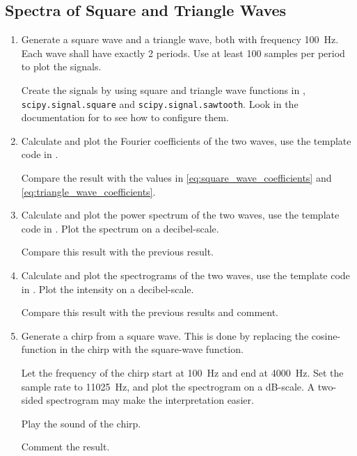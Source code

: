 \subsection{Spectra of Square and Triangle Waves}	
\begin{enumerate}[1)]
\item Generate a square wave and a triangle wave, both with frequency \qty{100}{Hz}. 
	Each wave shall have exactly 2 periods. Use at least 100 samples per period to plot the signals.
	
	Create the signals by using square and triangle wave functions in \scipy, \verb|scipy.signal.square| and \verb|scipy.signal.sawtooth|. Look in the documentation for \scipy to see how to configure them.
	
\item Calculate and plot the Fourier coefficients of the two waves, use the template code in .  

Compare the result with the values in \eqref{eq:square_wave_coefficients} and \eqref{eq:triangle_wave_coefficients}.

\item Calculate and plot the power spectrum of the two waves, use the template code in .
Plot the spectrum on a decibel-scale.

Compare this result with the previous result.

\item Calculate and plot the spectrograms of the two waves, use the template code in .
Plot the intensity on a decibel-scale.

Compare this result with the previous results and comment.

\item Generate a chirp from a square wave. This is done by replacing the cosine-function in the chirp with the square-wave function. 

Let the frequency of the chirp start at \qty{100}{Hz} and end at \qty{4000}{Hz}. Set the sample rate to \qty{11025}{Hz}, and plot the spectrogram on a dB-scale.
A two-sided spectrogram may make the interpretation easier.

Play the sound of the chirp.

Comment the result. 

\end{enumerate}
	



